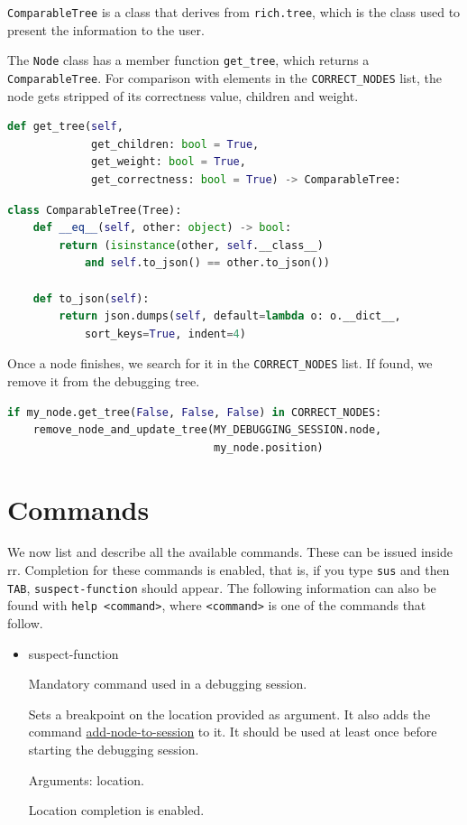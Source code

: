 \verb|ComparableTree| is a class that derives from \verb|rich.tree|, which is the class used to present the information to the user.

The \verb|Node| class has a member function \verb|get_tree|, which returns a \verb|ComparableTree|.
For comparison with elements in the \verb|CORRECT_NODES| list, the node gets stripped of its correctness value, children and weight. 
\begin{lstlisting}[language=Python, caption={Node class method signature for getting a comparable tree}]
def get_tree(self,
             get_children: bool = True,
             get_weight: bool = True,
             get_correctness: bool = True) -> ComparableTree:
\end{lstlisting}
\begin{lstlisting}[language=Python, caption=Comparable tree class]
class ComparableTree(Tree):
    def __eq__(self, other: object) -> bool:
        return (isinstance(other, self.__class__)
            and self.to_json() == other.to_json())

    def to_json(self):
        return json.dumps(self, default=lambda o: o.__dict__,
            sort_keys=True, indent=4)
\end{lstlisting}

Once a node finishes, we search for it in the \verb|CORRECT_NODES| list. If found, we remove it from the debugging tree.
\begin{lstlisting}[language=Python, caption=Removing finished node from tree if it is correct]
if my_node.get_tree(False, False, False) in CORRECT_NODES:
    remove_node_and_update_tree(MY_DEBUGGING_SESSION.node,
                                my_node.position)
\end{lstlisting}

\section{Commands}
We now list and describe all the available commands. These can be issued inside rr. Completion for these commands is enabled, that is, if you type \verb|sus| and then \verb|TAB|, \verb|suspect-function| should appear.
The following information can also be found with \verb|help <command>|, where \verb|<command>| is one of the commands that follow.

\begin{itemize}
    \item suspect-function
\label{command:suspect-function}

Mandatory command used in a debugging session.

Sets a breakpoint on the location provided as argument. It also adds the command \hyperref[command:add-node-to-session]{add-node-to-session} to it.
It should be used at least once before starting the debugging session.

Arguments: location.

Location completion is enabled.
\end{itemize}

